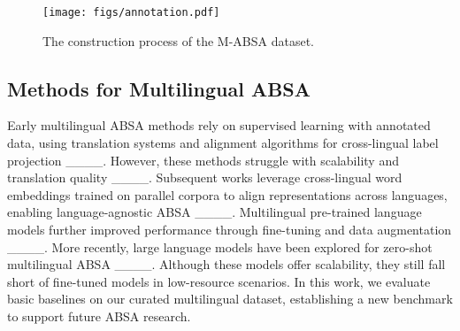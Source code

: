 \begin{figure*}[htbp] 
\centering 
\texttt{[image: figs/annotation.pdf]} 
\caption{The construction process of the M-ABSA dataset.} 
\label{fig:construction_process} 
\end{figure*}

\subsection{Methods for Multilingual ABSA}
Early multilingual ABSA methods rely on supervised learning with annotated data, using translation systems and alignment algorithms for cross-lingual label projection ____. However, these methods struggle with scalability and translation quality ____. Subsequent works leverage cross-lingual word embeddings trained on parallel corpora to align representations across languages, enabling language-agnostic ABSA ____. Multilingual pre-trained language models
further improved performance through fine-tuning and data augmentation ____. More recently, large language models have been explored for zero-shot multilingual ABSA ____. Although these models offer scalability, they still fall short of fine-tuned models in low-resource scenarios. In this work, we evaluate basic baselines on our curated multilingual dataset, establishing a new benchmark to support future ABSA research.